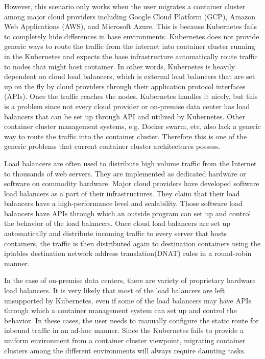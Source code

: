 However, this scenario only works when the user migrates a container cluster among major cloud providers including Google Cloud Platform (GCP), Amazon Web Applications (AWS), and Microsoft Azure.
This is because Kubernetes fails to completely hide differences in base environments.
Kubernetes does not provide generic ways to route the traffic from the internet into container cluster running in the Kubernetes and expects the base infrastructure automatically route traffic to nodes that might host container.
In other words, Kubernetes is heavily dependent on cloud load balancers, which is external load balancers that are set up on the fly by cloud providers through their application protocol interfaces (APIs).
Once the traffic reaches the nodes, Kubernetes handles it nicely, but this is a problem since not every cloud provider or on-premise data center has load balancers that can be set up through API and utilized by Kubernetes.
Other container cluster management systems, e.g. Docker swarm, etc, also lack a generic way to route the traffic into the container cluster.
Therefore this is one of the generic problems that current container cluster architectures possess.

Load balancers are often used to distribute high volume traffic from the Internet to thousands of web servers.
They are implemented as dedicated hardware or software on commodity hardware.
Major cloud providers have developed software load balancers\cite{eisenbud2016maglev,patel2013ananta} as a part of their infrastructures.
They claim that their load balancers have a high-performance level and scalability.
Those software load balancers have APIs through which an outside program can set up and control the behavior of the load balancers.
Once cloud load balancers are set up automatically and distribute incoming traffic to every server that hosts containers,
the traffic is then distributed again to destination containers using the iptables destination network address translation(DNAT)\cite{MartinA.Brown2017,Marmol2015} rules in a round-robin manner.

In the case of on-premise data centers, there are variety of proprietary hardware load balancers.
It is very likely that most of the load balancers are left unsupported by Kubernetes, even if some of the load balancers may have APIs through which a container management system can set up and control the behavior.
In these cases, the user needs to manually configure the static route for inbound traffic in an ad-hoc manner.
Since the Kubernetes fails to provide a uniform environment from a container cluster viewpoint, migrating container clusters among the different environments will always require daunting tasks.

